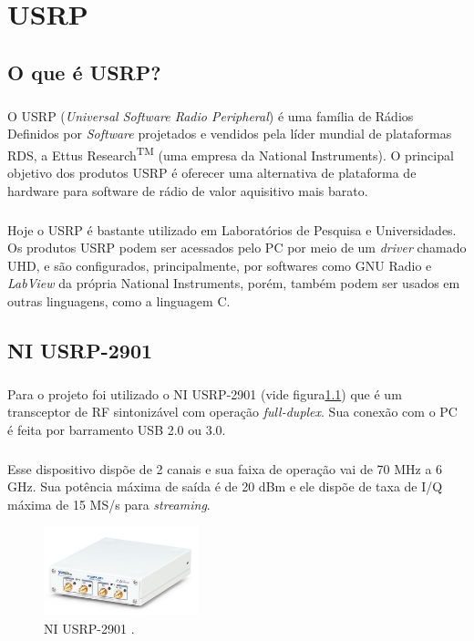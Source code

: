 \chapter{USRP}
\section{O que é USRP?}
\paragraph{} O USRP (\textit{Universal Software Radio Peripheral}) é uma família de Rádios Definidos por \textit{Software} projetados e vendidos pela líder mundial de plataformas RDS, a Ettus Research\textsuperscript{TM} (uma empresa da National Instruments). O principal objetivo dos produtos USRP é oferecer uma alternativa de plataforma de hardware para software de rádio de valor aquisitivo mais barato. 

\paragraph{} Hoje o USRP é bastante utilizado em Laboratórios de Pesquisa e Universidades. Os produtos USRP podem ser acessados pelo PC por meio de um \textit{driver} chamado UHD, e são configurados, principalmente, por softwares como GNU Radio e \textit{LabView} da própria National Instruments, porém, também podem ser usados em outras linguagens, como a linguagem C.

\section{NI USRP-2901}
\paragraph{} Para o projeto foi utilizado o NI USRP-2901 (vide figura\ref{fig:figura90}) que é um transceptor de RF sintonizável com operação \textit{full-duplex}. Sua conexão com o PC é feita por barramento USB 2.0 ou 3.0.

\paragraph{} Esse dispositivo dispõe de 2 canais e sua faixa de operação vai de 70 MHz a 6 GHz. Sua potência máxima de saída é de 20 dBm e ele dispõe de taxa de I/Q máxima de 15 MS/s para \textit{streaming}.

\begin{figure}[!ht]
	\centering
	\includegraphics[width=0.4\textwidth]{Figuras/usrp.PNG}   
	\caption{NI USRP-2901 \citep{ettus}. }
	\label{fig:figura90}
\end{figure}